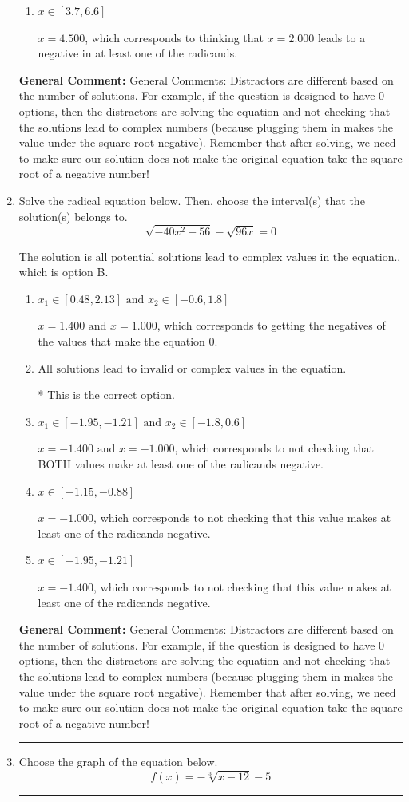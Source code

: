 \documentclass{extbook}[14pt]
\newcommand{\litem}[1]{\item #1

\rule{\textwidth}{0.4pt}}
\begin{document}
\begin{enumerate}
{\begin{enumerate}[label=\Alph*.]
$x = 2.000$, which corresponds to thinking that $x = 4.500$ leads to a negative in at least one of the radicands.
\item \( x \in [3.7,6.6] \)

$x = 4.500$, which corresponds to thinking that $x = 2.000$ leads to a negative in at least one of the radicands.
\end{enumerate}

\textbf{General Comment:} General Comments: Distractors are different based on the number of solutions. For example, if the question is designed to have 0 options, then the distractors are solving the equation and not checking that the solutions lead to complex numbers (because plugging them in makes the value under the square root negative). Remember that after solving, we need to make sure our solution does not make the original equation take the square root of a negative number!
}
\litem{
Solve the radical equation below. Then, choose the interval(s) that the solution(s) belongs to.
\[ \sqrt{-40 x^2 - 56} - \sqrt{96 x} = 0 \]

The solution is \( \text{all potential solutions lead to complex values in the equation.} \), which is option B.\begin{enumerate}[label=\Alph*.]
\item \( x_1 \in [0.48, 2.13] \text{ and } x_2 \in [-0.6,1.8] \)

$x = 1.400 \text{ and } x = 1.000$, which corresponds to getting the negatives of the values that make the equation 0.
\item \( \text{All solutions lead to invalid or complex values in the equation.} \)

* This is the correct option.
\item \( x_1 \in [-1.95, -1.21] \text{ and } x_2 \in [-1.8,0.6] \)

$x = -1.400 \text{ and } x = -1.000$, which corresponds to not checking that BOTH values make at least one of the radicands negative.
\item \( x \in [-1.15,-0.88] \)

$x = -1.000$, which corresponds to not checking that this value makes at least one of the radicands negative.
\item \( x \in [-1.95,-1.21] \)

$x = -1.400$, which corresponds to not checking that this value makes at least one of the radicands negative.
\end{enumerate}

\textbf{General Comment:} General Comments: Distractors are different based on the number of solutions. For example, if the question is designed to have 0 options, then the distractors are solving the equation and not checking that the solutions lead to complex numbers (because plugging them in makes the value under the square root negative). Remember that after solving, we need to make sure our solution does not make the original equation take the square root of a negative number!
}
\litem{
Choose the graph of the equation below.
\[ f(x) = - \sqrt[3]{x - 12} - 5 \]

}
\end{enumerate}
\end{document}
